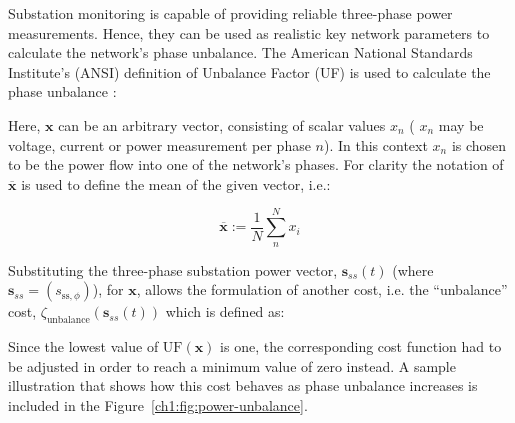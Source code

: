 
Substation monitoring is capable of providing reliable three-phase power measurements.
Hence, they can be used as realistic key network parameters to calculate the network's phase unbalance.
The American National Standards Institute's (ANSI) definition of Unbalance Factor (UF) is used to calculate the phase unbalance \cite{ANSI-MB-1-2011}:



Here, $\textbf{x}$ can be an arbitrary vector, consisting of scalar values $x_n$ ( $x_n$ may be voltage, current or power measurement per phase $n$).
In this context $x_n$ is chosen to be the power flow into one of the network's phases.
For clarity the notation of $\overline{\textbf{x}}$ is used to define the mean of the given vector, i.e.:

\begin{equation}
	\overline{\textbf{x}} := \frac{1}{N}\sum_n^N{x_i}
\end{equation}


Substituting the three-phase substation power vector, $\textbf{s}_{ss}(t)$ (where $\textbf{s}_{ss} = (s_{\text{ss},\phi})$), for $\textbf{x}$, allows the formulation of another cost, i.e. the ``unbalance'' cost, $\zeta_\text{unbalance}(\textbf{s}_{ss}(t))$ which is defined as:



Since the lowest value of $\text{UF}(\textbf{x})$ is one, the corresponding cost function had to be adjusted in order to reach a minimum value of zero instead.
A sample illustration that shows how this cost behaves as phase unbalance increases is included in the Figure~\ref{ch1:fig:power-unbalance}.

